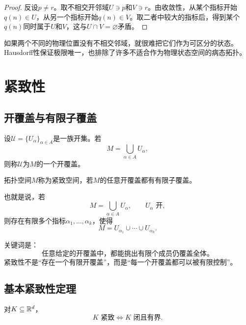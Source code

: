 \begin{proof}
反设$p\neq r$。取不相交开邻域$U\ni p$和$V\ni r$。由收敛性，从某个指标开始$q(n)\in U$，从另一个指标开始$q(n)\in V$。取二者中较大的指标后，得到某个$q(n)$同时属于$U$和$V$，这与$U\cap V=\varnothing$矛盾。
\end{proof}

\begin{remark}[流形为什么通常要求Hausdorff]
如果两个不同的物理位置没有不相交邻域，就很难把它们作为可区分的状态。Hausdorff性保证极限唯一，也排除了许多不适合作为物理状态空间的病态拓扑。
\end{remark}


\section{紧致性}

\subsection{开覆盖与有限子覆盖}

\begin{definition}[开覆盖]
设$\mathcal U=\{U_\alpha\}_{\alpha\in A}$是一族开集。若
\[
    M=\bigcup_{\alpha\in A}U_\alpha,
\]
则称$\mathcal U$为$M$的一个开覆盖。
\end{definition}

\begin{definition}[紧致空间]
拓扑空间$M$称为紧致空间，若$M$的任意开覆盖都有有限子覆盖。
\end{definition}

也就是说，若
\[
    M=\bigcup_{\alpha\in A}U_\alpha,
    \qquad U_\alpha\text{ 开},
\]
则存在有限多个指标$\alpha_1,\ldots,\alpha_k$，使得
\[
    M
    =
    U_{\alpha_1}\cup\cdots\cup U_{\alpha_k}.
\]

关键词是：
\[
    \boxed{
    \text{任意给定的开覆盖中，都能挑出有限个成员仍覆盖全体。}
    }
\]
紧致性不是“存在一个有限开覆盖”，而是“每一个开覆盖都可以被有限控制”。

\subsection{基本紧致性定理}

\begin{theorem}
对$K\subseteq\mathbb{R}^d$，
\[
    K\text{ 紧致}
    \iff
    K\text{ 闭且有界}.
\]
\end{theorem}

